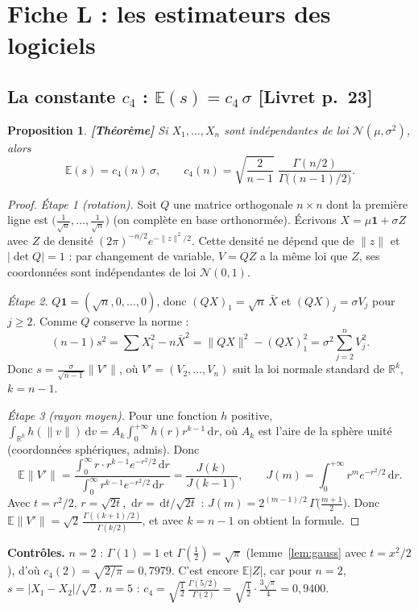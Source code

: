 \documentclass[11pt,a4paper]{article}
\theoremstyle{tq}
\newtheorem{prop}{Proposition}
\theoremstyle{remark}
\newcommand{\thm}{\textcolor{vertTQ}{\textbf{[Théorème]}}}
\newcommand{\liv}[1]{\textcolor{uimmblue}{\small[Livret p.~#1]}}
\newcommand{\E}{\mathbb{E}}
\newcommand{\R}{\mathbb{R}}
\newcommand{\N}{\mathcal{N}}
\newcommand{\Xb}{\bar{X}}
\newcommand{\dd}{\,\mathrm{d}}
\begin{document}
\section{Fiche L : les estimateurs des logiciels}\label{sec:L}

\subsection{La constante $c_4$ : $\E(s)=c_4\,\sigma$ \liv{23}}
\begin{prop}\thm{}
Si $X_1,\dots,X_n$ sont indépendantes de loi $\N(\mu,\sigma^2)$, alors
\[
\E(s)=c_4(n)\,\sigma,\qquad c_4(n)=\sqrt{\frac{2}{n-1}}\;\frac{\Gamma(n/2)}{\Gamma\big((n-1)/2\big)} .
\]
\end{prop}
\begin{proof}
\emph{Étape 1 (rotation).} Soit $Q$ une matrice orthogonale $n\times n$ dont la première ligne est $\big(\frac1{\sqrt n},\dots,\frac1{\sqrt n}\big)$ (on complète en base orthonormée). Écrivons $X=\mu\mathbf 1+\sigma Z$ avec $Z$ de densité $(2\pi)^{-n/2}e^{-\|z\|^2/2}$. Cette densité ne dépend que de $\|z\|$ et $|\det Q|=1$ : par changement de variable, $V=QZ$ a la même loi que $Z$, ses coordonnées sont indépendantes de loi $\N(0,1)$.

\emph{Étape 2.} $Q\mathbf 1=(\sqrt n,0,\dots,0)$, donc $(QX)_1=\sqrt n\,\Xb$ et $(QX)_j=\sigma V_j$ pour $j\ge2$. Comme $Q$ conserve la norme :
\[
(n-1)s^2=\sum X_i^2-n\Xb^2=\|QX\|^2-(QX)_1^2=\sigma^2\sum_{j=2}^nV_j^2 .
\]
Donc $s=\frac{\sigma}{\sqrt{n-1}}\|V'\|$, où $V'=(V_2,\dots,V_n)$ suit la loi normale standard de $\R^k$, $k=n-1$.

\emph{Étape 3 (rayon moyen).} Pour une fonction $h$ positive, $\int_{\R^k}h(\|v\|)\dd v=A_k\int_0^{+\infty}h(r)r^{k-1}\dd r$, où $A_k$ est l'aire de la sphère unité (coordonnées sphériques, admis). Donc
\[
\E\|V'\|=\frac{\int_0^\infty r\cdot r^{k-1}e^{-r^2/2}\dd r}{\int_0^\infty r^{k-1}e^{-r^2/2}\dd r}=\frac{J(k)}{J(k-1)},\qquad J(m)=\int_0^{+\infty}r^me^{-r^2/2}\dd r .
\]
Avec $t=r^2/2$, $r=\sqrt{2t}$, $\dd r=\dd t/\sqrt{2t}$ : $J(m)=2^{(m-1)/2}\,\Gamma\big(\tfrac{m+1}{2}\big)$. Donc $\E\|V'\|=\sqrt2\,\frac{\Gamma((k+1)/2)}{\Gamma(k/2)}$, et avec $k=n-1$ on obtient la formule.
\end{proof}
\textbf{Contrôles.} $n=2$ : $\Gamma(1)=1$ et $\Gamma(\frac12)=\sqrt\pi$ (lemme~\ref{lem:gauss} avec $t=x^2/2$), d'où $c_4(2)=\sqrt{2/\pi}=0{,}7979$. C'est encore $\E|Z|$, car pour $n=2$, $s=|X_1-X_2|/\sqrt2$. $n=5$ : $c_4=\sqrt{\tfrac12}\,\frac{\Gamma(5/2)}{\Gamma(2)}=\sqrt{\tfrac12}\cdot\frac{3\sqrt\pi}{4}=0{,}9400$.
\end{document}
